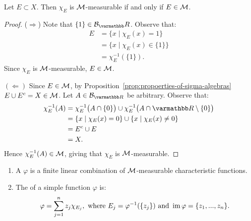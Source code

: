 \begin{proposition}
    Let $E \subset X$. Then $\chi_E$ is $\mathcal{M}$-measurable if and only if $E \in \mathcal{M}$.
\end{proposition}
    \begin{proof}
        ($\Rightarrow$) Note that $\{1\} \in \cB_\bfR$. Observe that:
            \begin{equation*}
            \begin{split}
                E
                & = \{x \mid \chi_E(x) = 1\} \\
                & = \{x \mid \chi_E(x) \in \{1\}\} \\
                & = \chi_E^{-1}(\{1\}).
            \end{split}
            \end{equation*}
        Since $\chi_E$ is $\mathcal{M}$-measurable, $E \in \mathcal{M}$.

        $(\Leftarrow)$ Since $E \in \mathcal{M}$, by Proposition~\ref{prop:propoerties-of-sigma-algebras} $E \cup E^c = X \in \mathcal{M}$. Let $A \in \cB_{\bfR}$ be arbitrary. Observe that:
            \begin{equation*}
            \begin{split}
                \chi_{E}^{-1}(A) 
                & = \chi_E^{-1}\bigl(A \cap \{0\}\bigr) \cup \chi_E^{-1}\bigl(A \cap \bfR\setminus\{0\}\bigr) \\
                & = \{x \mid \chi_E(x) = 0\} \cup \{x \mid \chi_E(x) \neq 0\} \\
                & = E^c \cup E \\
                & = X.
            \end{split}
            \end{equation*}
        Hence $\chi_E^{-1}(A) \in \mathcal{M}$, giving that $\chi_E$ is $\mathcal{M}$-measurable.
    \end{proof}

\begin{definition}
    \phantom{a}
    \begin{enumerate}[label = (\arabic*),itemsep=1pt,topsep=3pt]
        \item A  $\varphi$ is a finite linear combination of $\mathcal{M}$-measurable characteristic functions.
        \item The  of a simple function $\varphi$ is:
            \begin{equation*}
            \begin{split}
                \varphi = \sum_{j = 1}^n z_j \chi_{E_j}, \text{ where } E_j = \varphi^{-1}(\{z_j\}) \text{ and }\operatorname{im} \varphi = \{z_1,...,z_n\}.
            \end{split}
            \end{equation*}
    \end{enumerate}
\end{definition}


